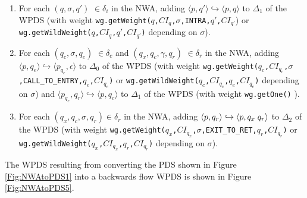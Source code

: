 \documentclass{llncs}
\begin{document}
\begin{enumerate}

\item For each $(q,\sigma,q')$ $\in \delta_i$ in the NWA, adding $\langle p,q' \rangle \hookrightarrow \langle p,q \rangle$ to $\Delta_1$ of the WPDS (with weight \texttt{wg.getWeight($q$,$CI_q$,$\sigma$,INTRA,$q'$,$CI_{q'}$}) or \texttt{wg.getWildWeight($q$,$CI_q$,$q'$,$CI_{q'}$)} depending on $\sigma$).

\item For each $(q_c,\sigma, q_e)$ $\in \delta_c$ and $(q_x,q_c,\gamma,q_r)$ $\in \delta_r$ in the NWA, adding $\langle p,q_e \rangle \hookrightarrow \langle p_{q_e},\epsilon \rangle$ to $\Delta_0$ of the WPDS (with weight \texttt{wg.getWeight($q_c$,$CI_{q_c}$,$\sigma$,CALL\_TO\_ENTRY,$q_e$,$CI_{q_e}$)} or \texttt{wg.getWildWeight($q_c$,$CI_{q_c}$,$q_e$,$CI_{q_e}$)} depending on $\sigma$) and $\langle p_{q_e},q_r \rangle \hookrightarrow \langle p,q_c \rangle$ to $\Delta_1$ of the WPDS (with weight \texttt{wg.getOne()} ).

\item For each $(q_x,q_c,\sigma,q_r) \in \delta_r$ in the NWA, adding $\langle p,q_r \rangle \hookrightarrow \langle p,q_x \hspace{.1cm} q_r \rangle$ to $\Delta_2$ of the WPDS (with weight \texttt{wg.getWeight($q_x$,$CI_{q_x}$,$\sigma$,EXIT\_TO\_RET,$q_r$,$CI_{q_r}$)} or \texttt{wg.getWildWeight($q_x$,$CI_{q_x}$,$q_r$,$CI_{q_r}$)} depending on $\sigma$).

\end{enumerate}

\noindent The WPDS resulting from converting the PDS shown in Figure \ref{Fig:NWAtoPDS1} into a backwards flow WPDS is shown in Figure \ref{Fig:NWAtoPDS5}. \\
\end{document}
